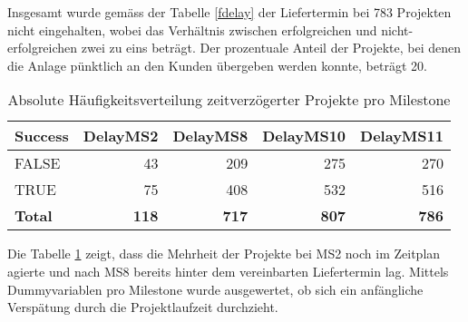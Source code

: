 Insgesamt wurde gemäss der Tabelle \ref{fdelay} der Liefertermin bei 783 Projekten nicht eingehalten, wobei das Verhältnis zwischen erfolgreichen und nicht-erfolgreichen zwei zu eins beträgt. Der prozentuale Anteil der Projekte, bei denen die Anlage pünktlich an den Kunden übergeben werden konnte, beträgt 20. 
\begin{table}[H]
	\centering
	\caption{Absolute Häufigkeitsverteilung zeitverzögerter Projekte pro Milestone}
	\begin{tabular}{lrrrr}
		\textbf{Success} & \multicolumn{1}{l}{\textbf{DelayMS2}} & \multicolumn{1}{l}{\textbf{DelayMS8}} & \multicolumn{1}{l}{\textbf{DelayMS10}} & \multicolumn{1}{l}{\textbf{DelayMS11}} \\\hline
		FALSE & 43    & 209   & 275   & 270 \\
		TRUE  & 75    & 408   & 532   & 516 \\\hline
		\textbf{Total} & \textbf{118} & \textbf{717} & \textbf{807} &  \textbf{786}
	\end{tabular}%
	\label{fdelayms}%
\end{table}
Die Tabelle \ref{fdelayms} zeigt, dass die Mehrheit der Projekte bei MS2 noch im Zeitplan agierte und nach MS8 bereits hinter dem vereinbarten Liefertermin lag. Mittels Dummyvariablen pro Milestone wurde ausgewertet, ob sich ein anfängliche Verspätung durch die Projektlaufzeit durchzieht.
